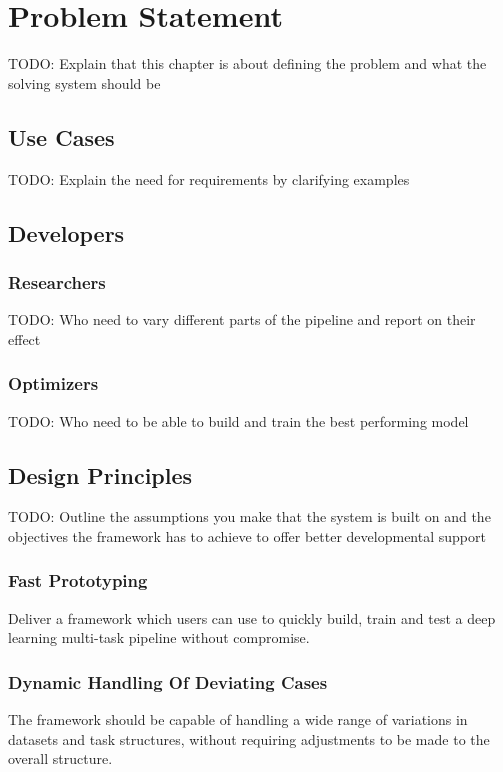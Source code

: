 \chapter{Problem Statement}
TODO: Explain that this chapter is about defining the problem and what the solving system should be

\section{Use Cases}
TODO: Explain the need for requirements by clarifying examples



\section{Developers}

\subsection{Researchers}
TODO: Who need to vary different parts of the pipeline and report on their effect

\subsection{Optimizers}
TODO: Who need to be able to build and train the best performing model

\section{Design Principles}

TODO: Outline the assumptions you make that the system is built on and the objectives the framework has to achieve to offer better developmental support

\subsection{Fast Prototyping}

Deliver a framework which users can use to quickly build, train and test a deep learning multi-task pipeline without compromise. 

\subsection{Dynamic Handling Of Deviating Cases}

The framework should be capable of handling a wide range of variations in datasets and task structures, without requiring adjustments to be made to the overall structure.

